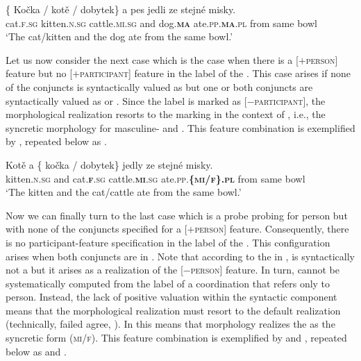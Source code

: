 \documentclass[output=paper,modfontsnewtxmath,hidelinks]{langscibook}
\begin{document}
\ea\gll \{\hspace{-2pt} Kočka / kotě / dobytek\} a pes jedli ze stejné misky.\label{baseline-anim-rep}\\
{} cat.\textsc{f.sg} {} kitten.\textsc{n.sg} {} cattle.\textsc{mi.sg} and dog.\textsc{\textbf{ma}} ate.\textsc{pp.\textbf{ma}.pl} from same bowl\\
\glt `The cat/kitten and the dog ate from the same bowl.'\\\hfill {}
\z

\noindent Let us now consider the next case which is the case when there is a [$+$\textsc{person}] feature but no [$+$\textsc{participant}] feature in the label of the . This case arises if none of the conjuncts is syntactically valued as   but one or both conjuncts are syntactically valued as   or . Since the label is marked as [$-$\textsc{participant}], the morphological realization resorts to the  marking in the context of , i.e., the syncretic morphology for masculine-  and  . This feature combination is exemplified by , repeated below as .

\ea\gll Kotě a \{\hspace{-2pt} kočka / dobytek\} jedly ze stejné misky.\label{baseline-inanim-rep}\\
kitten.\textsc{n.sg} and {} cat.\textsc{\textbf{f}.sg} {} cattle.\textsc{\textbf{mi}.sg} ate.\textsc{pp.\textbf{\{mi/f\}.pl}} from same bowl\\
\glt `The kitten and the cat/cattle ate from the same bowl.'\\\hfill{}
\z

\noindent Now we can finally turn to the last case which is a probe probing for person but with none of the conjuncts specified for a [$+$\textsc{person}] feature. Consequently, there is no participant-feature specification in the label of the . This configuration arises when both conjuncts are in . Note that according to the  in ,  is syntactically not a  but it arises as a realization of the [$-$\textsc{person}] feature.  In turn,   cannot be systematically computed from the label of a coordination that refers only to person. Instead, the lack of positive valuation  within the syntactic component means that the morphological realization must resort to the default  realization (technically, failed agree, \citealt{Preminger2009}). In  this means that  morphology realizes the  as the syncretic   form (\textsc{mi/f}). This feature combination is exemplified by  and , repeated below as  and .
\end{document}

